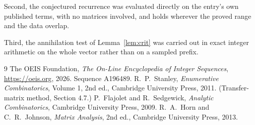 \documentclass[11pt,a4paper]{article}
\theoremstyle{plain}
\theoremstyle{definition}
\begin{document}
Second, the conjectured recurrence was evaluated directly on the entry's own published terms,
with no matrices involved, and holds wherever the proved range and the data overlap.

Third, the annihilation test of Lemma~\ref{lem:crit} was carried out in exact integer
arithmetic on the whole vector rather than on a sampled prefix.

\begin{thebibliography}{9}
 The OEIS Foundation, \emph{The On-Line Encyclopedia of Integer
Sequences}, \url{https://oeis.org}, 2026. Sequence A196489.
 R.~P.~Stanley, \emph{Enumerative Combinatorics}, Volume 1, 2nd ed.,
Cambridge University Press, 2011. (Transfer-matrix method, Section 4.7.)
 P.~Flajolet and R.~Sedgewick, \emph{Analytic Combinatorics}, Cambridge
University Press, 2009.
 R.~A.~Horn and C.~R.~Johnson, \emph{Matrix Analysis}, 2nd ed., Cambridge
University Press, 2013.
\end{thebibliography}
\end{document}
